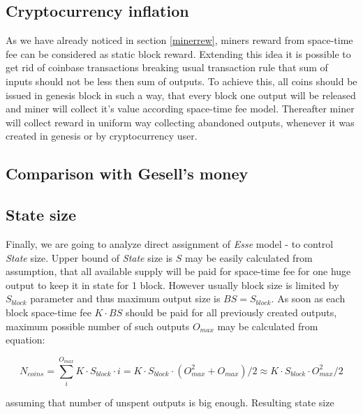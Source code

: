 \documentclass[]{article}   %
\newcommand{\authnote}[2]{\marginpar{\parbox{\marginparwidth}{\tiny %
  \textsf{#1 {\textcolor{blue}{notes: #2}}}}}%
  \textcolor{blue}{\textbf{\dag}}}
\newcommand{\authnote}[2]{
  \textsf{#1 \textcolor{blue}{: #2}}}
\newcommand{\authnote}[2]{}
\newcommand{\dnote}[1]{{\authnote{\textcolor{blue}{Dima notes}}{#1}}}
\newcommand{\esse}{\textit{Esse}}
\newcommand{\state}{\textit{State}}
\begin{document}
\dnote{What is an output value when miner is interested in collecting it?}

\subsection{Cryptocurrency inflation}

As we have already noticed in section \ref{minerrew}, miners reward from space-time fee can be considered as static block reward. Extending this idea it is possible to get rid of coinbase transactions breaking usual transaction rule that sum of inputs should not be less then sum of outputs. To achieve this, all coins should be issued in genesis block in such a way, that every block one output will be released and miner will collect it's value according space-time fee model. Thereafter miner will collect reward in uniform way collecting abandoned outputs, whenever it was created in genesis or by cryptocurrency user.

\subsection{Comparison with Gesell's money}

\dnote{Comparison with Gesell's money~(money with demurrage)}

\subsection{State size}

Finally, we are going to analyze direct assignment of \esse{} model - to control \state{} size. Upper bound of \state{} size is $S$ may be easily calculated from assumption, that all available supply will be paid for space-time fee for one huge output to keep it in state for 1 block. However usually block size is limited by $S_{block}$ parameter and thus maximum output size is $BS = S_{block}$. As soon as each block space-time fee $K \cdot BS$ should be paid for all previously created outputs, maximum possible number of such outputs $O_{max}$ may be calculated from equation:

\begin{equation}
N_{coins} = \sum_i^{O_{max}}{K \cdot S_{block} \cdot i} = K \cdot S_{block} \cdot ( O_{max}^2 + O_{max}) / 2 \approx K \cdot S_{block} \cdot O_{max}^2 / 2
\end{equation}

assuming that number of unspent outputs is big enough. Resulting state size
\end{document}
